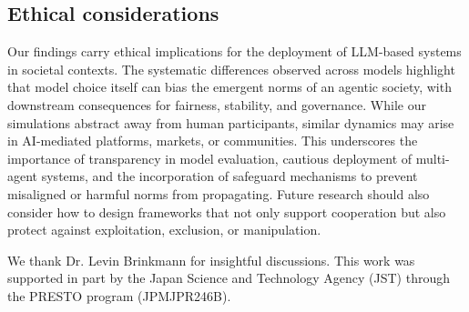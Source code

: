 \documentclass[sigconf]{aamas}
\begin{document}
\subsection{Ethical considerations}
Our findings carry ethical implications for the deployment of LLM-based systems in societal contexts. 
The systematic differences observed across models highlight that model choice itself can bias the emergent norms of an agentic society, with downstream consequences for fairness, stability, and governance. 
While our simulations abstract away from human participants, similar dynamics may arise in AI-mediated platforms, markets, or communities. 
This underscores the importance of transparency in model evaluation, cautious deployment of multi-agent systems, and the incorporation of safeguard mechanisms to prevent misaligned or harmful norms from propagating. 
Future research should also consider how to design frameworks that not only support cooperation but also protect against exploitation, exclusion, or manipulation.

\begin{acks}
We thank Dr. Levin Brinkmann for insightful discussions. This work was supported in part by the Japan Science and Technology Agency (JST) through the PRESTO program (JPMJPR246B).
\end{acks}

 



\newpage
\end{document}
